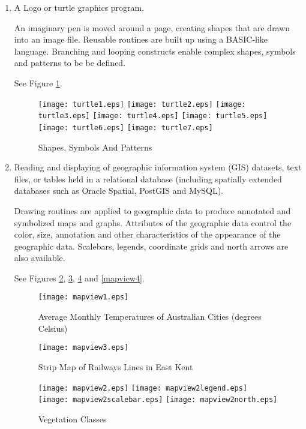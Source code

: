 \begin{enumerate}
\item

A Logo or turtle graphics program.

An imaginary pen is moved around a page,
creating shapes that are drawn into an image file.
Reusable routines are built up using a BASIC-like language.
Branching and looping constructs enable complex shapes, symbols and patterns
to be be defined.

See Figure \ref{turtle}.

\begin{figure}[htb]
\texttt{[image: turtle1.eps]}
\texttt{[image: turtle2.eps]}
\texttt{[image: turtle3.eps]}
\texttt{[image: turtle4.eps]}
\texttt{[image: turtle5.eps]}
\texttt{[image: turtle6.eps]}
\texttt{[image: turtle7.eps]}
\caption{Shapes, Symbols And Patterns}
\label{turtle}
\end{figure}

\item

Reading and displaying of geographic information
system (GIS) datasets, text files, or tables held in a relational database
(including spatially extended databases such as Oracle Spatial,
PostGIS and MySQL).

Drawing routines are applied to geographic data to produce annotated and
symbolized maps and graphs.  Attributes of the geographic data control
the color, size, annotation and other characteristics of the
appearance of the geographic data.
Scalebars, legends, coordinate grids and north arrows are also available.

See Figures \ref{mapview1}, \ref{mapview3}, \ref{mapview2} and
\ref{mapview4}.

\begin{figure}
\texttt{[image: mapview1.eps]}
\caption[Average Monthly Temperatures]{Average Monthly Temperatures of Australian Cities (degrees Celsius)}
\label{mapview1}
\end{figure}

\begin{figure}
\texttt{[image: mapview3.eps]}
\caption{Strip Map of Railways Lines in East Kent}
\label{mapview3}
\end{figure}

\begin{figure}

\texttt{[image: mapview2.eps]}
\texttt{[image: mapview2legend.eps]}
\vspace{1pt}
\texttt{[image: mapview2scalebar.eps]}
\texttt{[image: mapview2north.eps]}
\caption{Vegetation Classes}
\label{mapview2}
\end{figure}


\end{enumerate}

